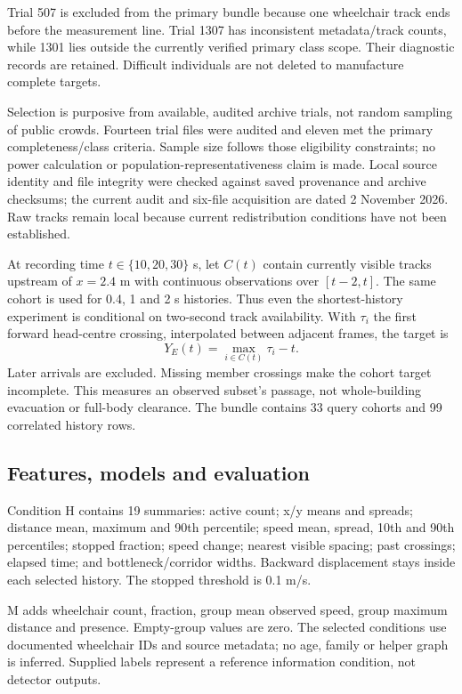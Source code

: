 \documentclass[conference]{IEEEtran}
\begin{document}
Trial 507 is excluded from the primary bundle because one wheelchair track ends before the measurement line. Trial 1307 has inconsistent metadata/track counts, while 1301 lies outside the currently verified primary class scope. Their diagnostic records are retained. Difficult individuals are not deleted to manufacture complete targets.

Selection is purposive from available, audited archive trials, not random sampling of public crowds. Fourteen trial files were audited and eleven met the primary completeness/class criteria. Sample size follows those eligibility constraints; no power calculation or population-representativeness claim is made. Local source identity and file integrity were checked against saved provenance and archive checksums; the current audit and six-file acquisition are dated 2 November 2026. Raw tracks remain local because current redistribution conditions have not been established.

At recording time $t\in\{10,20,30\}$ s, let $C(t)$ contain currently visible tracks upstream of $x=2.4$ m with continuous observations over $[t-2,t]$. The same cohort is used for 0.4, 1 and 2 s histories. Thus even the shortest-history experiment is conditional on two-second track availability. With $\tau_i$ the first forward head-centre crossing, interpolated between adjacent frames, the target is
\begin{equation}Y_E(t)=\max_{i\in C(t)}\tau_i-t.\end{equation}
Later arrivals are excluded. Missing member crossings make the cohort target incomplete. This measures an observed subset's passage, not whole-building evacuation or full-body clearance. The bundle contains 33 query cohorts and 99 correlated history rows.

\subsection{Features, models and evaluation}
Condition H contains 19 summaries: active count; x/y means and spreads; distance mean, maximum and 90th percentile; speed mean, spread, 10th and 90th percentiles; stopped fraction; speed change; nearest visible spacing; past crossings; elapsed time; and bottleneck/corridor widths. Backward displacement stays inside each selected history. The stopped threshold is 0.1 m/s.

M adds wheelchair count, fraction, group mean observed speed, group maximum distance and presence. Empty-group values are zero. The selected conditions use documented wheelchair IDs and source metadata; no age, family or helper graph is inferred. Supplied labels represent a reference information condition, not detector outputs.
\end{document}
